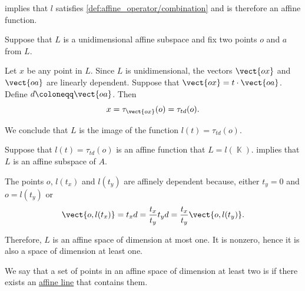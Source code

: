 \begin{defproof}
    implies that \( l \) satisfies \cref{def:affine_operator/combination} and is therefore an affine function.

   Suppose that \( L \) is a unidimensional affine subspace and fix two points \( o \) and \( a \) from \( L \).

  Let \( x \) be any point in \( L \). Since \( L \) is unidimensional, the vectors \( \vect{ox} \) and \( \vect{oa} \) are linearly dependent. Suppose that \( \vect{ox} = t \cdot \vect{oa} \). Define \( d \coloneqq \vect{oa} \). Then
  \begin{equation*}
    x = \tau_{\vect{ox}}(o) = \tau_{td}(o).
  \end{equation*}

  We conclude that \( L \) is the image of the function \( l(t) = \tau_{td}(o) \).

   Suppose that \( l(t) = \tau_{td}(o) \) is an affine function that \( L = l(\BbbK) \).  implies that \( L \) is an affine subspace of \( A \).

  The points \( o \), \( l(t_x) \) and \( l(t_y) \) are affinely dependent because, either \( t_y = 0 \) and \( o = l(t_y) \) or
  \begin{equation*}
    \vect{o,l(t_x)} = t_x d = \frac {t_x} {t_y} t_y d = \frac {t_x} {t_y} \vect{o,l(t_y)}.
  \end{equation*}

  Therefore, \( L \) is an affine space of dimension at most one. It is nonzero, hence it is also a space of dimension at least one.
\end{defproof}

\begin{definition}\label{def:collinear_points}\mimprovised
  We say that a set of points in an affine space of dimension at least two is  if there exists an \hyperref[def:affine_line]{affine line} that contains them.
\end{definition}

